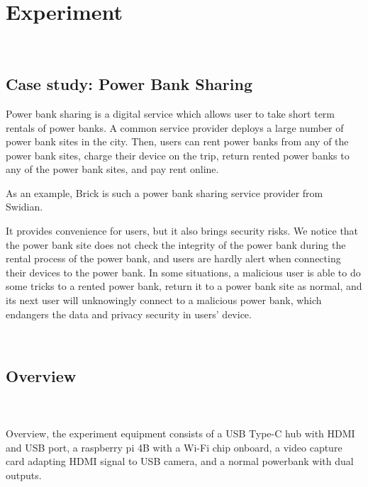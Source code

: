 \section{Experiment}
\label{sec:experiment}
\noindent{}\\

\subsection{Case study: Power Bank Sharing}

Power bank sharing is a digital service which allows user to take short term rentals of power banks. A common service provider deploys a large number of power bank sites in the city. Then, users can rent power banks from any of the power bank sites, charge their device on the trip, return rented power banks to any of the power bank sites, and pay rent online.


As an example, Brick is such a power bank sharing service provider from Swidian. 


It provides convenience for users, but it also brings security risks. We notice that the power bank site does not check the integrity of the power bank during the rental process of the power bank, and users are hardly alert when connecting their devices to the power bank. In some situations, a malicious user is able to do some tricks to a rented power bank, return it to a power bank site as normal, and its next user will unknowingly connect to a malicious power bank, which endangers the data and privacy security in users' device.


\\

\subsection{Overview}

\\
\\
Overview, the experiment equipment consists of
a USB Type-C hub with HDMI and USB port,
a raspberry pi 4B with a Wi-Fi chip onboard,
a video capture card adapting HDMI signal to USB camera,
and a normal powerbank with dual outputs.

